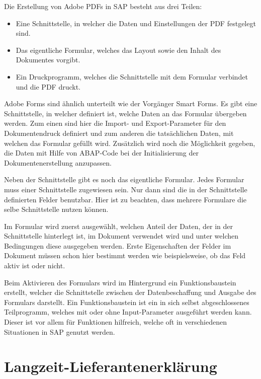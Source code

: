   

Die Erstellung von Adobe PDFs in SAP besteht aus drei Teilen:

\begin{itemize}
	\item Eine Schnittstelle, in welcher die Daten und Einstellungen der PDF festgelegt sind.
	\item Das eigentliche Formular, welches das Layout sowie den Inhalt des Dokumentes vorgibt.
	\item Ein Druckprogramm, welches die Schnittstelle mit dem Formular verbindet und die PDF druckt.
\end{itemize}

Adobe Forms sind ähnlich unterteilt wie der Vorgänger Smart Forms. Es gibt eine Schnittstelle, in welcher definiert ist, welche Daten an das Formular übergeben werden. Zum einen sind hier die Import- und Export-Parameter für den Dokumentendruck definiert und zum anderen die tatsächlichen Daten, mit welchen das Formular gefüllt wird. Zusätzlich wird noch die Möglichkeit gegeben, die Daten mit Hilfe von \ac{ABAP}-Code bei der Initialisierung der Dokumentenerstellung anzupassen.

Neben der Schnittstelle gibt es noch das eigentliche Formular. Jedes Formular muss einer Schnittstelle zugewiesen sein. Nur dann sind die in der Schnittstelle definierten Felder benutzbar. Hier ist zu beachten, dass mehrere Formulare die selbe Schnittstelle nutzen können.

Im Formular wird zuerst ausgewählt, welchen Anteil der Daten, der in der Schnittstelle hinterlegt ist, im Dokument verwendet wird und unter welchen Bedingungen diese ausgegeben werden. Erste Eigenschaften der Felder im Dokument müssen schon hier bestimmt werden wie beispielsweise, ob das Feld aktiv ist oder nicht.

Beim Aktivieren des Formulars wird im Hintergrund ein Funktionsbaustein erstellt, welcher die Schnittstelle zwischen der Datenbeschaffung und Ausgabe des Formulars darstellt. Ein Funktionsbaustein ist ein in sich selbst abgeschlossenes Teilprogramm, welches mit oder ohne Input-Parameter ausgeführt werden kann. Dieser ist vor allem für Funktionen hilfreich, welche oft in verschiedenen Situationen in SAP genutzt werden.

       


\section{Langzeit-Lieferantenerklärung}

